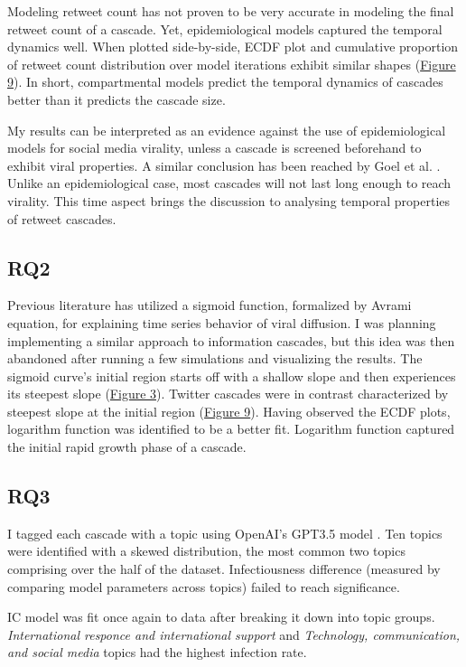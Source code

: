 \documentclass[11pt,a4paper]{article}
\begin{document}
    Modeling retweet count has not proven to be very accurate in modeling the final retweet count of a cascade. Yet, epidemiological models captured the temporal dynamics well. When plotted side-by-side, ECDF plot and cumulative proportion of retweet count distribution over model iterations exhibit similar shapes (\hyperlink{fig:ecdf-vs-iter}{Figure 9}). In short, compartmental models predict the temporal dynamics of cascades better than it predicts the cascade size.

    My results can be interpreted as an evidence against the use of epidemiological models for social media virality, unless a cascade is screened beforehand to exhibit viral properties. A similar conclusion has been reached by Goel et al. \cite{goel_note_2015}. Unlike an epidemiological case, most cascades will not last long enough to reach virality. This time aspect brings the discussion to analysing temporal properties of retweet cascades.

    
    \subsection{RQ2}
    Previous literature \cite{shirzad_critical_2023} has utilized a sigmoid function, formalized by Avrami equation, for explaining time series behavior of viral diffusion. I was planning implementing a similar approach to information cascades, but this idea was then abandoned after running a few simulations and visualizing the results. The sigmoid curve's initial region starts off with a shallow slope and then experiences its steepest slope (\hyperlink{fig:sigmoid}{Figure 3}). Twitter cascades were in contrast characterized by steepest slope at the initial region (\hyperlink{fig:ecdf-vs-iter}{Figure 9}). Having observed the ECDF plots, logarithm function was identified to be a better fit. Logarithm function captured the initial rapid growth phase of a cascade.

    \subsection{RQ3}

    I tagged each cascade with a topic using OpenAI's GPT3.5 model \cite{openai_llc_openai_2023}. Ten topics were identified with a skewed distribution, the most common two topics comprising over the half of the dataset. Infectiousness difference (measured by comparing model parameters across topics) failed to reach significance.

    IC model was fit once again to data after breaking it down into topic groups. \textit{International responce and international support} and \textit{Technology, communication, and social media} topics had the highest infection rate.
    
\end{document}
